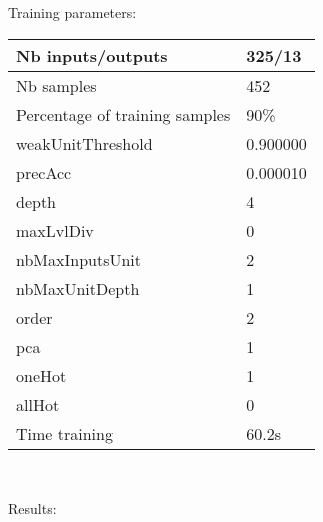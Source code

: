 Training parameters:\\
\begin{center}
\begin{tabular}{|l|l|}
\hline
Nb inputs/outputs&325/13\\
\hline
Nb samples&452\\
\hline
Percentage of training samples&90\%\\
\hline
weakUnitThreshold&0.900000\\
\hline
precAcc&0.000010\\
\hline
depth&4\\
\hline
maxLvlDiv&0\\
\hline
nbMaxInputsUnit&2\\
\hline
nbMaxUnitDepth&1\\
\hline
order&2\\
\hline
pca&1\\
\hline
oneHot&1\\
\hline
allHot&0\\
\hline
Time training&60.2s\\
\hline
\end{tabular}\\
\end{center}\newline
Results:
